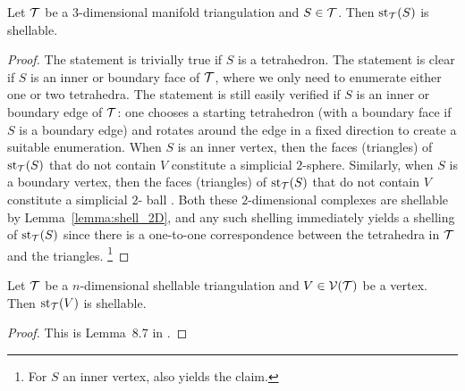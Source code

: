 \documentclass[10pt,a4paper]{article}
\newcommand\cye[1]{%
\protect\leavevmode
\begingroup
    \color{blue}%
    #1%
\endgroup
}
\newcommand{\disk}{\cye{ball}}
\begin{document}
\begin{lemma}
    Let ${\mathcal T}$ be a $3$-dimensional manifold triangulation and $S \in {\mathcal T}$.
    Then $\operatorname{st}_{{\mathcal T}}(S)$ is shellable. 
\end{lemma}
\begin{proof}
    The statement is trivially true if $S$ is a tetrahedron. 
    The statement is clear if $S$ is an inner or boundary face of ${\mathcal T}$,
    where we only need to enumerate either one or two tetrahedra. 
    The statement is still easily verified if $S$ is an inner or boundary edge of ${\mathcal T}$:
    one chooses a starting tetrahedron (with a boundary face if $S$ is a boundary edge) and rotates around the edge in a fixed direction to create a suitable enumeration. 
    When $S$ is an inner vertex, then the faces (triangles) of $\operatorname{st}_{{\mathcal T}}(S)$ that do not contain $V$ constitute a simplicial $2$-sphere.
    Similarly, when $S$ is a boundary vertex, then the faces (triangles) of $\operatorname{st}_{{\mathcal T}}(S)$ that do not contain $V$ constitute a simplicial $2$-\disk.
    Both these $2$-dimensional complexes are shellable by Lemma~\ref{lemma:shell_2D}, and any such shelling immediately yields a shelling of $\operatorname{st}_{{\mathcal T}}(S)$ since there is a one-to-one correspondence between the tetrahedra in ${\mathcal T}$ and the triangles.
    \footnote{For $S$ an inner vertex, \cite[Lemma~B.1]{ern2020stable} also yields the claim.}
\end{proof}


\begin{lemma}\label{lemma:stars_are_shellable}
    Let ${\mathcal T}$ be a $n$-dimensional shellable triangulation and $V \in {\mathcal V}({\mathcal T})$ be a vertex.
    Then $\operatorname{st}_{{\mathcal T}}(V)$ is shellable. 
\end{lemma}
\begin{proof}
    This is Lemma~8.7 in \cite{ziegler1995lectures}.
\end{proof}
\end{document}
